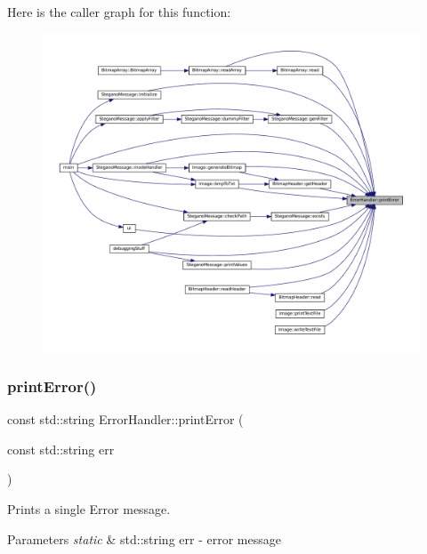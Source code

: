 Here is the caller graph for this function\+:
\nopagebreak
\begin{figure}[H]
\begin{center}
\leavevmode
\includegraphics[width=350pt]{classErrorHandler_ab90b8248f24e3129df69d224585956dd_icgraph}
\end{center}
\end{figure}
\mbox{\label{classErrorHandler_ad1e6aa8018e2a22460a1431e6e7d8804}} 
\subsubsection{\texorpdfstring{printError()}{printError()}\hspace{0.1cm}{\footnotesize\ttfamily [2/2]}}
{\footnotesize\ttfamily const std\+::string Error\+Handler\+::print\+Error (\begin{DoxyParamCaption}\item[{const std\+::string}]{err }\end{DoxyParamCaption})}



Prints a single Error message. 


\begin{DoxyParams}{Parameters}
{\em static} & std\+::string err -\/ error message \\
\hline
\end{DoxyParams}


